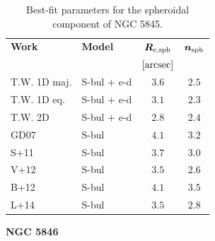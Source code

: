 \documentclass[preprint2]{emulateapj}
\begin{document}
  \begin{table}[h]
  \small
  \caption{Best-fit parameters for the spheroidal component of NGC 5845.}
  \begin{center}
  \begin{tabular}{llcc}
  \hline
  {\bf Work} & {\bf Model}   & $\bm R_{\rm e,sph}$    & $\bm n_{\rm sph}$ \\
    &  &  $[\rm arcsec]$ & \\
  \hline
  T.W. 1D maj. & S-bul + e-d & $3.6$  &  $2.5$ \\
  T.W. 1D eq.  & S-bul + e-d & $3.1$  &  $2.3$ \\
  T.W. 2D      & S-bul + e-d & $2.8$  &  $2.4$ \\
  \hline
  GD07      & S-bul & $4.1$  &  $3.2$ \\
  S+11      & S-bul & $3.7$  &  $3.0$ \\
  V+12      & S-bul & $3.5$  &  $2.6$ \\
  B+12      & S-bul & $4.1$  &  $3.5$ \\
  L+14      & S-bul & $3.5$  &  $2.8$ \\
  \hline
  \end{tabular}
  \end{center}
  \label{tab:n5845}
  \end{table}



  \clearpage\newpage\noindent
  {\bf NGC 5846 \\}
\end{document}
